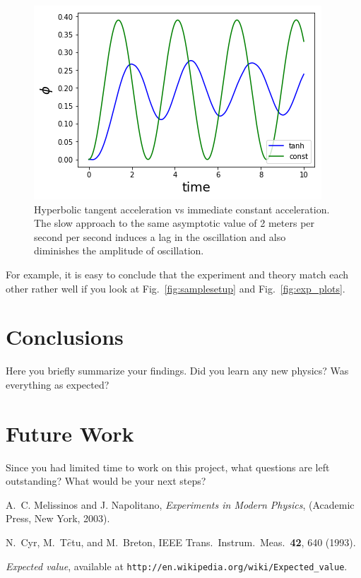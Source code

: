 \documentclass[letterpaper,12pt]{article}
\begin{document}
\begin{figure}
    \centering
    \includegraphics[width=.7\textwidth]{tanh_vs_const_1.png}
    \caption{Hyperbolic tangent acceleration vs immediate constant acceleration. The slow approach to the same asymptotic value of 2 meters per second per second induces a lag in the oscillation and also diminishes the amplitude of oscillation.}
\end{figure}

For example, it is easy to conclude that the
experiment and theory match each other rather well if you look at
Fig.~\ref{fig:samplesetup} and Fig.~\ref{fig:exp_plots}.


\section{Conclusions}
Here you briefly summarize your findings. Did you learn any new physics? Was everything as expected?

\blindtext

\section{Future Work}
Since you had limited time to work on this project, what questions are left outstanding? What would be your next steps? 

\blindtext


\begin{thebibliography}{99}

A.~C. Melissinos and J. Napolitano, \textit{Experiments in Modern Physics},
(Academic Press, New York, 2003).

N.\ Cyr, M.\ T$\hat{e}$tu, and M.\ Breton,
IEEE Trans.\ Instrum.\ Meas.\ \textbf{42}, 640 (1993).

 \emph{Expected value},  available at
\texttt{http://en.wikipedia.org/wiki/Expected\_value}.

\end{thebibliography}
\end{document}
